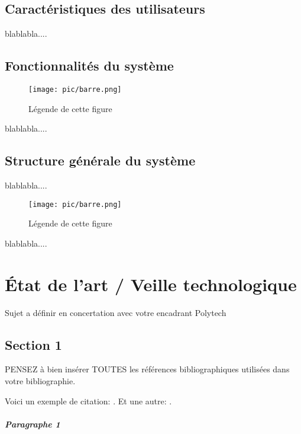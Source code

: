 \documentclass{polytech/polytech}
\numberwithin{figure}{chapter}
\begin{document}
\section{Caractéristiques des utilisateurs}

blablabla.... 

\section{Fonctionnalités du système}

\begin{figure*}[ht] 
    \centering 
    \texttt{[image: pic/barre.png]} 
    \caption{Légende de cette figure}
    \label{UnNomDeFigure}
\end{figure*}

blablabla....

\section{Structure générale du système}

blablabla....

\begin{figure*}[ht] 
    \centering 
    \texttt{[image: pic/barre.png]} 
    \caption{Légende de cette figure}
    \label{UnAutreNomDeFigure}
\end{figure*}

blablabla....

\chapter{État de l'art / Veille technologique}

Sujet a définir en concertation avec votre encadrant Polytech

\section{Section 1}

PENSEZ à bien insérer TOUTES les références bibliographiques
utilisées dans votre bibliographie.

Voici un exemple de citation: \cite{DBLP:journals/corr/abs-1804-02767}.
Et une autre: \linebreak \cite{DBLP:journals/corr/RedmonDGF15}.

\paragraph{Paragraphe 1}
\end{document}
